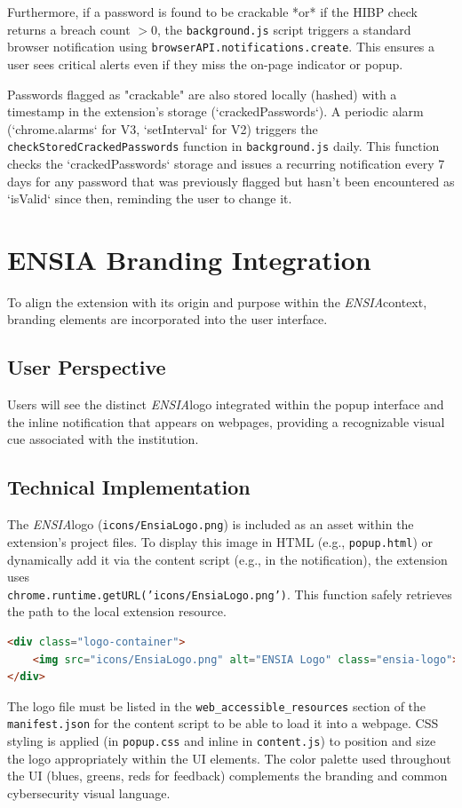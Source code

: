 \documentclass[11pt,oneside,a4paper]{book}
\newcommand{\esia}{\textit{ENSIA}}
\begin{document}
Furthermore, if a password is found to be crackable *or* if the HIBP check returns a breach count $> 0$, the \texttt{background.js} script triggers a standard browser notification using \texttt{browserAPI.notifications.create}. This ensures a user sees critical alerts even if they miss the on-page indicator or popup.

Passwords flagged as "crackable" are also stored locally (hashed) with a timestamp in the extension's storage (`crackedPasswords`). A periodic alarm (`chrome.alarms` for V3, `setInterval` for V2) triggers the \texttt{checkStoredCrackedPasswords} function in \texttt{background.js} daily. This function checks the `crackedPasswords` storage and issues a recurring notification every 7 days for any password that was previously flagged but hasn't been encountered as `isValid` since then, reminding the user to change it.

\section{ENSIA Branding Integration}
To align the extension with its origin and purpose within the \esia context, branding elements are incorporated into the user interface.

\subsection{User Perspective}
Users will see the distinct \esia logo integrated within the popup interface and the inline notification that appears on webpages, providing a recognizable visual cue associated with the institution.

\subsection{Technical Implementation}
The \esia logo (\texttt{icons/EnsiaLogo.png}) is included as an asset within the extension's project files. To display this image in HTML (e.g., \texttt{popup.html}) or dynamically add it via the content script (e.g., in the notification), the extension uses\\ \texttt{chrome.runtime.getURL('icons/EnsiaLogo.png')}. This function safely retrieves the path to the local extension resource.
\begin{lstlisting}[language=html, caption=ENSIA Logo in popup.html]
<div class="logo-container">
    <img src="icons/EnsiaLogo.png" alt="ENSIA Logo" class="ensia-logo">
</div>
\end{lstlisting}
The logo file must be listed in the \texttt{web\_accessible\_resources} section of the \texttt{manifest.json} for the content script to be able to load it into a webpage. CSS styling is applied (in \texttt{popup.css} and inline in \texttt{content.js}) to position and size the logo appropriately within the UI elements. The color palette used throughout the UI (blues, greens, reds for feedback) complements the branding and common cybersecurity visual language.
\end{document}
